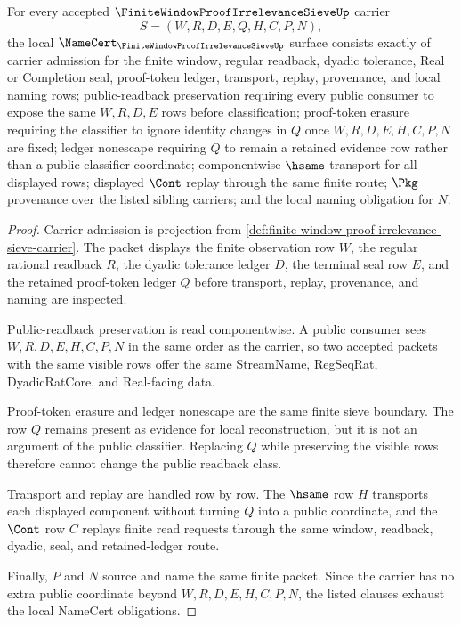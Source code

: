 \begin{theorem}
\label{thm:finite-window-proof-irrelevance-sieve-namecert-obligations}
For every accepted $\FiniteWindowProofIrrelevanceSieveUp$ carrier
$$
S=(W,R,D,E,Q,H,C,P,N),
$$
the local $\NameCert_{\FiniteWindowProofIrrelevanceSieveUp}$ surface consists exactly of carrier admission for the finite window, regular readback, dyadic tolerance, Real or Completion seal, proof-token ledger, transport, replay, provenance, and local naming rows; public-readback preservation requiring every public consumer to expose the same $W,R,D,E$ rows before classification; proof-token erasure requiring the classifier to ignore identity changes in $Q$ once $W,R,D,E,H,C,P,N$ are fixed; ledger nonescape requiring $Q$ to remain a retained evidence row rather than a public classifier coordinate; componentwise $\hsame$ transport for all displayed rows; displayed $\Cont$ replay through the same finite route; $\Pkg$ provenance over the listed sibling carriers; and the local naming obligation for $N$.
\end{theorem}
\begin{proof}
Carrier admission is projection from \autoref{def:finite-window-proof-irrelevance-sieve-carrier}. The packet displays the finite observation row $W$, the regular rational readback $R$, the dyadic tolerance ledger $D$, the terminal seal row $E$, and the retained proof-token ledger $Q$ before transport, replay, provenance, and naming are inspected.

Public-readback preservation is read componentwise. A public consumer sees $W,R,D,E,H,C,P,N$ in the same order as the carrier, so two accepted packets with the same visible rows offer the same StreamName, RegSeqRat, DyadicRatCore, and Real-facing data.

Proof-token erasure and ledger nonescape are the same finite sieve boundary. The row $Q$ remains present as evidence for local reconstruction, but it is not an argument of the public classifier. Replacing $Q$ while preserving the visible rows therefore cannot change the public readback class.

Transport and replay are handled row by row. The $\hsame$ row $H$ transports each displayed component without turning $Q$ into a public coordinate, and the $\Cont$ row $C$ replays finite read requests through the same window, readback, dyadic, seal, and retained-ledger route.

Finally, $P$ and $N$ source and name the same finite packet. Since the carrier has no extra public coordinate beyond $W,R,D,E,H,C,P,N$, the listed clauses exhaust the local NameCert obligations.
\end{proof}


